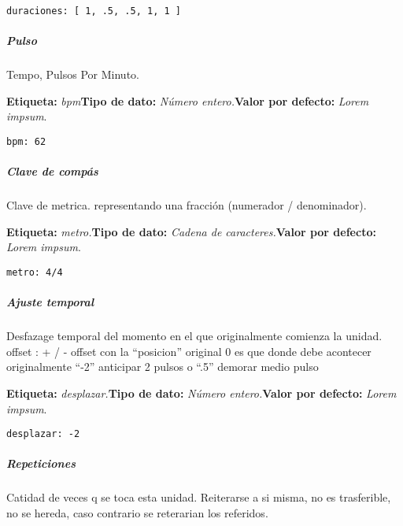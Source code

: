 \documentclass[]{article}
\let\oldsubparagraph\subparagraph
\renewcommand{\subparagraph}[1]{\oldsubparagraph{#1}\mbox{}}
\begin{document}
\begin{verbatim}
duraciones: [ 1, .5, .5, 1, 1 ]
\end{verbatim}

\hypertarget{pulso}{%
\subparagraph{Pulso}\label{pulso}}

Tempo, Pulsos Por Minuto.

\textbf{Etiqueta:} \emph{bpm}\newline \textbf{Tipo de dato:}
\emph{Número entero.}\newline \textbf{Valor por defecto:} \emph{Lorem
impsum}.\newline

\begin{verbatim}
bpm: 62
\end{verbatim}

\hypertarget{clave-de-compuxe1s}{%
\subparagraph{Clave de compás}\label{clave-de-compuxe1s}}

Clave de metrica. representando una fracción (numerador / denominador).

\textbf{Etiqueta:} \emph{metro.}\newline \textbf{Tipo de dato:}
\emph{Cadena de caracteres.}\newline \textbf{Valor por defecto:}
\emph{Lorem impsum}.\newline

\begin{verbatim}
metro: 4/4
\end{verbatim}

\hypertarget{ajuste-temporal}{%
\subparagraph{Ajuste temporal}\label{ajuste-temporal}}

Desfazage temporal del momento en el que originalmente comienza la
unidad. offset : + / - offset con la ``posicion'' original 0 es que
donde debe acontecer originalmente ``-2'' anticipar 2 pulsos o ``.5''
demorar medio pulso

\textbf{Etiqueta:} \emph{desplazar.}\newline \textbf{Tipo de dato:}
\emph{Número entero.}\newline \textbf{Valor por defecto:} \emph{Lorem
impsum}.\newline

\begin{verbatim}
desplazar: -2
\end{verbatim}

\hypertarget{repeticiones}{%
\subparagraph{Repeticiones}\label{repeticiones}}

Catidad de veces q se toca esta unidad. Reiterarse a si misma, no es
trasferible, no se hereda, caso contrario se reterarian los referidos.
\end{document}
